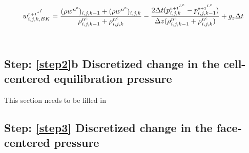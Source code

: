 \documentclass[fleqn]{article}
\begin{document}
{\begin{equation*}
    w^{\nadv^{*^f}}_{i,j,k,BK}= \frac{(\rho \wvelnc)_{i,j,k-1} + (\rho \wvelnc)_{i,j,k}}{
    \rhonc_{i,j,k-1} + \rhonc_{i,j,k} }
-   \frac{ 2\delt(\pnnLc_{i,j,k}-\pnnLc_{i,j,k-1} ) }{\Delta{z}(\rhonc_{i,j,k-1} +      \rhonc_{i,j,k})}
+   g_z \delt 
\end{equation*}
\\
%
\subsection{Step: \ref{step2}b \textsf{Discretized change in the cell-centered equilibration pressure}}
This section needs to be filled in
%
%
%
\subsection{Step: \ref{step3} \textsf{Discretized change in the face-centered pressure}}


}
\end{document}
